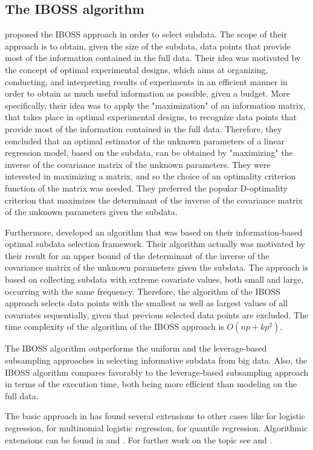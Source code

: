 \documentclass[12pt]{article}
\theoremstyle{definition}
\begin{document}
	\subsection{The IBOSS algorithm}
	\cite{wang2019information} proposed the IBOSS approach in order to select subdata. The scope of their approach is to obtain, given the size of the subdata, data points that provide most of the information contained in the full data. Their idea was motivated by the concept of optimal experimental designs, which aims at organizing, conducting, and interpreting results of experiments in an efficient manner in order to obtain as much useful information as possible, given a budget. More specifically, their idea was to apply the "maximization" of an information matrix, that takes place in optimal experimental designs, to recognize data points that provide most of the information contained in the full data. Therefore, they concluded that an optimal estimator of the unknown parameters of a linear regression model, based on the subdata, can be obtained by "maximizing" the inverse of the covariance matrix of the unknown parameters. They were interested in maximizing a matrix, and so the choice of an optimality criterion function of the matrix was needed. They preferred the popular D-optimality criterion that maximizes the determinant of the inverse of the covariance matrix of the unknown parameters given the subdata.
	
	Furthermore, \cite{wang2019information} developed an algorithm that was based on their information-based optimal subdata selection framework. Their algorithm actually was motivated by their result for an upper bound of the determinant of the inverse of the covariance matrix of the unknown parameters given the subdata. The approach is based on collecting subdata with extreme covariate values, both small and large, occurring with the same frequency. Therefore, the algorithm of the IBOSS approach selects data points with the smallest as well as largest values of all covariates sequentially, given that previous selected data points are excluded. The time complexity of the algorithm of the IBOSS approach is $O(np+kp^2)$.
	
	The IBOSS algorithm  outperforms the uniform and the leverage-based subsampling approaches in selecting informative subdata from big data. Also, the IBOSS algorithm compares favorably to the leverage-based subsampling approach in terms of the execution time, both being more efficient than modeling on the full data.
	
	The basic approach in \cite{wang2019information} has found several extensions to other cases like
	\cite{cheng2020information} for logistic regression, \cite{yao2019optimal} for multinomial logistic regression, \cite{wang2021optimal} for quantile regression. Algorithmic extensions can be found in
	\cite{wang2019divide} and \cite{lee2021fast}.
	For further work on the topic see \cite{yao2021review} and \cite{deldossi2021optimal}.
	
\end{document}
